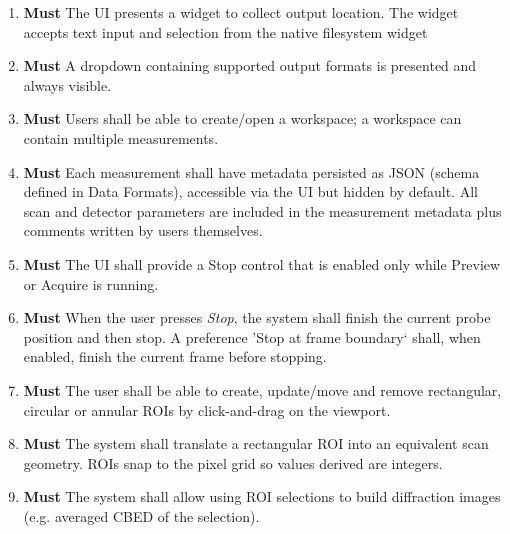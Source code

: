 \documentclass[10pt]{article}
\newcommand{\PriorityTag}[2]{%
    \colorbox{#2!25}{\footnotesize\textsf{\textbf{#1}}}\hspace{0.6em}}
\newcommand{\must}{\leavevmode\PriorityTag{Must}{green}}
\newcounter{reqgrp}[section] %
\newcounter{reqno}
\newcommand{\reqprefix}{GEN}
\newenvironment{requirements}[1]{%
    \renewcommand{\reqprefix}{#1}%
    \refstepcounter{reqgrp}%
    \setcounter{reqno}{0}%
    \begin{enumerate}[leftmargin=*]
    }{\end{enumerate}}
\begin{document}
\begin{requirements}{UI}
        \item \must {}
        {The UI presents a widget to collect output location. The widget accepts text input and selection from the native filesystem widget}

        \item \must {}
        {A dropdown containing supported output formats is presented and always visible.}

        \item \must {}
        {Users shall be able to create/open a workspace; a workspace can contain multiple measurements.}

        \item \must {}
        {Each measurement shall have metadata persisted as JSON (schema defined in Data Formats), accessible via the UI but hidden by default. All scan and detector parameters are included in the measurement metadata plus comments written by users themselves.}

        \item \must {}
        {The UI shall provide a Stop control that is enabled only while Preview or Acquire is running.}

        \item \must {}
        {When the user presses \emph{Stop}, the system shall finish the current probe position and then stop. A preference 'Stop at frame boundary` shall, when enabled, finish the current frame before stopping.}

        \item \label{req:ui:roi} \must {}
        {The user shall be able to create, update/move and remove rectangular, circular or annular ROIs by click-and-drag on the viewport.}

        \item \must {}
        {The system shall translate a rectangular ROI into an equivalent scan geometry. ROIs snap to the pixel grid so values derived are integers.}

        \item \must {}
        {The system shall allow using ROI selections to build diffraction images (e.g. averaged CBED of the selection).}


\end{requirements}
\end{document}
